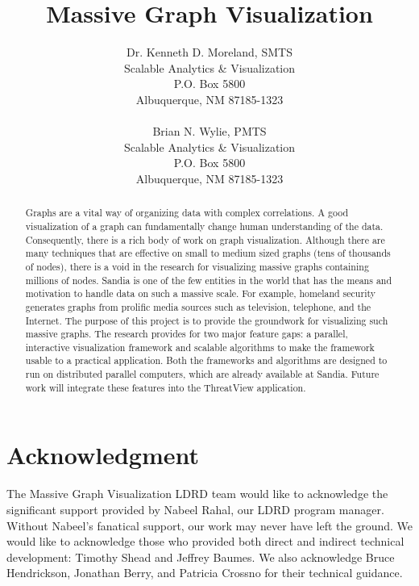 \documentclass[pdf,12pt,report,strict]{SANDreport}
\title{Massive Graph Visualization}
\author{Dr. Kenneth D. Moreland, SMTS\\
Scalable Analytics \& Visualization\\
P.O. Box 5800\\
Albuquerque, NM 87185-1323\\
\\
Brian N. Wylie, PMTS\\
Scalable Analytics \& Visualization\\
P.O. Box 5800\\
Albuquerque, NM 87185-1323}
\date{}					%
\makeatletter
\newcommand{\threatview}{ThreatView\texttrademark\index{ThreatView@ThreatView\texttrademark}\xspace}
\makeatother
\begin{document}
\maketitle

% 
\begin{abstract}
  Graphs are a vital way of organizing data with complex correlations. A
  good visualization of a graph can fundamentally change human
  understanding of the data. Consequently, there is a rich body of work on
  graph visualization.  Although there are many techniques that are
  effective on small to medium sized graphs (tens of thousands of nodes),
  there is a void in the research for visualizing massive graphs containing
  millions of nodes. Sandia is one of the few entities in the world that
  has the means and motivation to handle data on such a massive scale. For
  example, homeland security generates graphs from prolific media sources
  such as television, telephone, and the Internet.  The purpose of this
  project is to provide the groundwork for visualizing such massive graphs.
  The research provides for two major feature gaps: a parallel, interactive
  visualization framework and scalable algorithms to make the framework
  usable to a practical application.  Both the frameworks and algorithms
  are designed to run on distributed parallel computers, which are already
  available at Sandia.  Future work will integrate these features into the
  \threatview application.
\end{abstract}


% 
\clearpage
\chapter*{Acknowledgment}

The Massive Graph Visualization LDRD team would like to acknowledge the
significant support provided by Nabeel Rahal, our LDRD program manager.
Without Nabeel's fanatical support, our work may never have left the
ground.  We would like to acknowledge those who provided both direct
and indirect technical development: Timothy Shead and Jeffrey Baumes.  We
also acknowledge Bruce Hendrickson, Jonathan Berry, and Patricia Crossno
for their technical guidance.


% 
\cleardoublepage		%
\tableofcontents
\listoffigures
\end{document}

